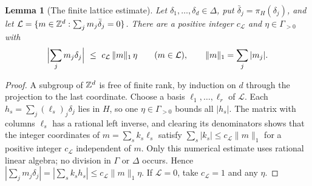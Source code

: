\documentclass[11pt]{article}
\theoremstyle{plain}
\newtheorem{lemma}[lemma]{Lemma}
\theoremstyle{plain}
\theoremstyle{plain}
\theoremstyle{definition}
\theoremstyle{definition}
\theoremstyle{definition}
\theoremstyle{definition}
\theoremstyle{remark}
\begin{document}
\begin{lemma}[The finite lattice estimate]\label{ent:mv:lem:lattice}
Let $\delta_1,\ldots,\delta_d\in\Delta$, put $\bar\delta_j=\pi_H(\delta_j)$,
and let $\mathcal L=\{m\in\mathbb Z^d:\sum_jm_j\bar\delta_j=0\}$. There are a
positive integer $c_{\mathcal L}$ and $\eta\in\Gamma_{>0}$ with
\begin{equation}\label{ent:mv:eq:lattice}
 \Bigl|\sum_jm_j\delta_j\Bigr|\ \le\ c_{\mathcal L}\,\|m\|_1\,\eta
 \qquad(m\in\mathcal L),\qquad \|m\|_1=\sum_j|m_j|.
\end{equation}
\end{lemma}
\begin{proof}
A subgroup of $\mathbb Z^d$ is free of finite rank, by induction on $d$ through the
projection to the last coordinate. Choose a basis $\ell_1,\ldots,\ell_r$ of
$\mathcal L$. Each $h_s=\sum_j(\ell_s)_j\delta_j$ lies in $H$, so one
$\eta\in\Gamma_{>0}$ bounds all $|h_s|$. The matrix with columns $\ell_s$ has
a rational left inverse, and clearing its denominators shows that the
integer coordinates of $m=\sum_sk_s\ell_s$ satisfy
$\sum_s|k_s|\le c_{\mathcal L}\|m\|_1$ for a positive integer
$c_{\mathcal L}$ independent of $m$. Only this numerical estimate uses
rational linear algebra; no division in $\Gamma$ or $\Delta$ occurs. Hence
$|\sum_jm_j\delta_j|=|\sum_sk_sh_s|\le c_{\mathcal L}\|m\|_1\eta$. If
$\mathcal L=0$, take $c_{\mathcal L}=1$ and any $\eta$.
\end{proof}
\end{document}
